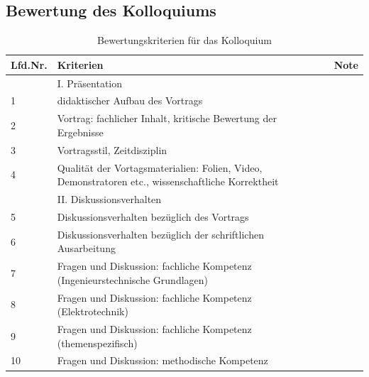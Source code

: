 \subsection{Bewertung des Kolloquiums}

\begin{table}[!h]
\centering
\begin{tabular}{ |p{1cm}|p{9cm}|p{0.7cm}|  }
 \hline
 Lfd.Nr.&Kriterien&Note \\  
\hline\hline
& I. Präsentation&\\
\hline
1   &didaktischer Aufbau des Vortrags&\\
\hline
2   &Vortrag: fachlicher Inhalt, kritische Bewertung der Ergebnisse&\\
\hline
3   &Vortragsstil, Zeitdisziplin&\\
\hline
4   &Qualität der Vortagsmaterialien: Folien, Video, Demonstratoren etc., wissenschaftliche Korrektheit&\\
\hline
& II. Diskussionsverhalten&\\
\hline
5   &Diskussionsverhalten bezüglich des Vortrags&\\
\hline
6   &Diskussionsverhalten bezüglich der schriftlichen Ausarbeitung&\\
\hline
7   &Fragen und Diskussion: fachliche Kompetenz (Ingenieurstechnische Grundlagen)&\\
\hline
8   &Fragen und Diskussion: fachliche Kompetenz (Elektrotechnik)&\\
\hline
9   &Fragen und Diskussion: fachliche Kompetenz (themenspezifisch)&\\
\hline 
10  &Fragen und Diskussion: methodische Kompetenz&\\
\hline
\end{tabular}
\caption{Bewertungskriterien für das Kolloquium}
\label{tab:kolloquium}
\end{table}


